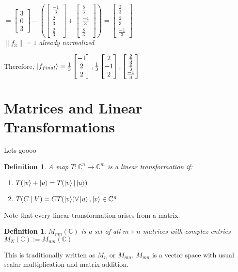 \documentclass[12pt]{article}
\theoremstyle{plain}
\theoremstyle{nonumberplain}
\theoremstyle{plain}
\newtheorem{definition}[lemma]{Definition}
\theoremstyle{nonumberplain}
\newcommand\1{{\bf 1}}
\newcommand{\bmat}[1]{\begin{bmatrix*} #1 \end{bmatrix*}} %
\newcommand{\C}{\mathbb{C}} %
\newcommand{\<}{\left\langle}
\renewcommand{\>}{\right\rangle}
\newcommand{\norm}[1]{\left\lVert#1\right\rVert} %
\begin{document}
\begin{enumerate}
\begin{center}
$=\bmat{3 \\ 0 \\ 3}-\left( \bmat{\frac{-1}{3} \\ \frac{2}{3} \\ \frac{2}{3}} + \bmat{\frac{8}{3} \\ \frac{-4}{3} \\ \frac{8}{3}} \right) =\bmat{\frac{2}{3} \\ \frac{2}{3} \\ \frac{-1}{3}}$ \\
$\norm{f_3}=1$ \textit{already normalized}
\end{center}
\end{enumerate}
Therefore, $\ket{f_{final}}=\frac{1}{3}\bmat{-1 \\ 2 \\ 2}, \frac{1}{3}\bmat{2 \\ -1 \\ 2}, \bmat{\frac{2}{3} \\ \frac{2}{3} \\ \frac{-1}{3}}$

\section{Matrices and Linear Transformations}
Lets goooo
\begin{definition}
A map $T: \C^n\longrightarrow\C^m$ is a linear transformation if:
\begin{enumerate}
	\item $T(\ket{v}+\ket{u}=T(\ket{v}|\ket{u})$
	\item $T(C\mid V)=CT(\ket{v}) \forall \ket{u},\ket{v}\in\C^n$
\end{enumerate}
\end{definition}
Note that every linear transformation arises from a matrix.
\begin{definition}
$M_{mn}(\C)$ is a set of all $m\times n$ matrices with complex entries $M_N(\C):=M_{nm}(\C)$
\end{definition}
This is traditionally written as $M_n$ or $M_{mn}$. $M_{mn}$ is a vector space with usual scalar multiplication and matrix addition.
\end{document}
